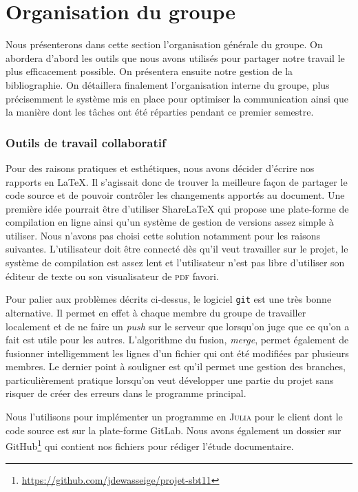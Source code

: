 \section{Organisation du groupe}
Nous présenterons dans cette section l'organisation générale du groupe.
On abordera d'abord les outils que nous avons utilisés pour partager notre travail
le plus efficacement possible.
On présentera ensuite notre gestion de la bibliographie.
On détaillera finalement l'organisation interne du groupe,
plus précisemment le système mis en place pour optimiser la communication
ainsi que la manière dont les tâches ont été réparties pendant ce premier semestre.

\subsubsection*{Outils de travail collaboratif}
Pour des raisons pratiques et esthétiques, nous avons décider d'écrire
nos rapports en \LaTeX.
Il s'agissait donc de trouver la meilleure façon de partager le code source
et de pouvoir contrôler les changements apportés au document.
Une première idée pourrait être d'utiliser ShareLaTeX qui propose une plate-forme
de compilation en ligne ainsi qu'un système de gestion de versions
assez simple à utiliser.
Nous n'avons pas choisi cette solution notamment pour les raisons suivantes.
L'utilisateur doit être connecté dès qu'il veut travailler sur le projet,
le système de compilation est assez lent et l'utilisateur n'est pas libre
d'utiliser son éditeur de texte ou son visualisateur de \textsc{pdf} favori.

Pour palier aux problèmes décrits ci-dessus, le logiciel \texttt{git}
est une très bonne alternative.
Il permet en effet à chaque membre du groupe de travailler localement
et de ne faire un \emph{push} sur le serveur que lorsqu'on juge
que ce qu'on a fait est utile pour les autres.
L'algorithme du fusion, \emph{merge}, permet également de fusionner intelligemment
les lignes d'un fichier qui ont été modifiées par plusieurs membres.
Le dernier point à souligner est qu'il permet une gestion des branches,
particulièrement pratique lorsqu'on veut développer une partie du projet
sans risquer de créer des erreurs dans le programme principal.

Nous l'utilisons pour implémenter un programme en \textsc{Julia}
pour le client dont le code source est sur la plate-forme GitLab.
Nous avons également un dossier sur
GitHub\footnote{\url{https://github.com/jdewasseige/projet-sbt11}}
qui contient nos fichiers pour rédiger l'étude documentaire.


